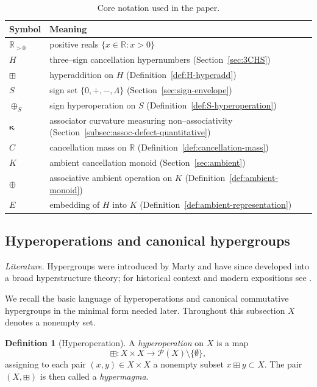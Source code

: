 \documentclass[11pt]{amsart}
\numberwithin{equation}{section}
\theoremstyle{definition}
\newtheorem{definition}[theorem]{Definition}
\theoremstyle{remark}
\newcommand{\R}{\mathbb{R}}
\newcommand{\Rp}{\mathbb{R}_{>0}}
\newcommand{\Sset}{S}                      %
\newcommand{\AssocCurv}{\boldsymbol{\kappa}} %
\newcommand{\sop}{\oplus_S}                %
\newcommand{\Eemb}{E}                      %
\newcommand{\Cfun}{C}                      %
\begin{document}
\begin{table}[ht]
\centering
\caption{Core notation used in the paper.}
\label{tab:notation}
\begin{tabular}{@{}ll@{}}
\toprule
Symbol & Meaning \\ \midrule
$\Rp$ & positive reals $\{x\in\R:x>0\}$ \\
$H$ & three--sign cancellation hypernumbers (Section~\ref{sec:3CHS}) \\
$\boxplus$ & hyperaddition on $H$ (Definition~\ref{def:H-hyperadd}) \\
$\Sset$ & sign set $\{0,+,-,\Lambda\}$ (Section~\ref{sec:sign-envelope}) \\
$\sop$ & sign hyperoperation on $\Sset$ (Definition~\ref{def:S-hyperoperation}) \\
$\AssocCurv$ & associator curvature measuring non--associativity (Section~\ref{subsec:assoc-defect-quantitative}) \\
$\Cfun$ & cancellation mass on $\R$ (Definition~\ref{def:cancellation-mass}) \\
$K$ & ambient cancellation monoid (Section~\ref{sec:ambient}) \\
$\oplus$ & associative ambient operation on $K$ (Definition~\ref{def:ambient-monoid}) \\
$\Eemb$ & embedding of $H$ into $K$ (Definition~\ref{def:ambient-representation}) \\
\bottomrule
\end{tabular}
\end{table}

\subsection{Hyperoperations and canonical hypergroups}
\label{subsec:hypergroups}

\noindent
\emph{Literature.}  Hypergroups were introduced by Marty and have since developed
into a broad hyperstructure theory; for historical context and modern
expositions see \cite{Golzio2018Survey,Massouros2023Borderline}.

We recall the basic language of hyperoperations and canonical
commutative hypergroups in the minimal form needed later.  Throughout
this subsection $X$ denotes a nonempty set.

\begin{definition}[Hyperoperation]\label{def:hyperoperation}
A \emph{hyperoperation} on $X$ is a map
\[
  \boxplus : X\times X \longrightarrow
             \mathcal{P}(X)\setminus\{\emptyset\},
\]
assigning to each pair $(x,y)\in X\times X$ a nonempty subset
$x\boxplus y\subset X$.  The pair $(X,\boxplus)$ is then called a
\emph{hypermagma}.
\end{definition}
\end{document}
